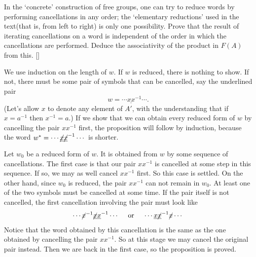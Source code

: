 \documentclass[12pt,letterpaper,boxed]{hmcpset}
\begin{document}
\begin{problem}[5.4]
	In the \textquoteleft concrete’ construction of free groups, one can try to reduce words by performing cancellations in any order; the \textquoteleft elementary reductions' used in the text(that is, from left to right) is only one possibility. Prove that the result of iterating cancellations on a word is independent of the order in which the cancellations are performed. Deduce the associativity of the product in $F(A)$ from this. []
\end{problem}
\begin{solution}
	We use induction on the length of $w$. If $w$ is reduced, there is nothing to show. If not, there must be some pair of symbols that can be cancelled, say the underlined pair	
	$$w = \cdots \underline{xx}^{-1}\cdots.$$
	(Let's allow $x$ to denote any element of $A'$, with the understanding that if $x = a^{-1}$ then $x^{-1} = a$.) If we show that we can obtain every reduced form of $w$ by cancelling the pair $xx^{-1}$ first, the proposition will follow by induction, because the word $w^* = \cdots  \underline{\cancel{x}\cancel{x}}^{-1}\cdots$ is shorter.
	
	Let $w_0$ be a reduced form of $w$. It is obtained from $w$ by some sequence of cancellations. The first case is that our pair $xx^{-1}$ is cancelled at some step in this sequence. If so, we may as well cancel $xx^{-1}$ first. So this case is settled. On the other hand, since $w_0$ is reduced, the pair $xx^{-1}$ can not remain in $w_0$. At least one of the two symbols must be cancelled at some time. If the pair itself is not cancelled, the first cancellation involving the pair must look like
	\[
	 \cdots \cancel{x}^{-1}\underline{\cancel{x}x}^{-1}\cdots\quad \text{  or  }\quad  \cdots \underline{x\cancel{x}}^{-1}\cancel{x}\cdots
	\]
	Notice that the word obtained by this cancellation is the same as the one obtained by	cancelling the pair $xx^{-1}$. So at this stage we may cancel the original pair instead. Then we are back in the first case, so the  proposition is proved.

\end{solution}
\end{document}
